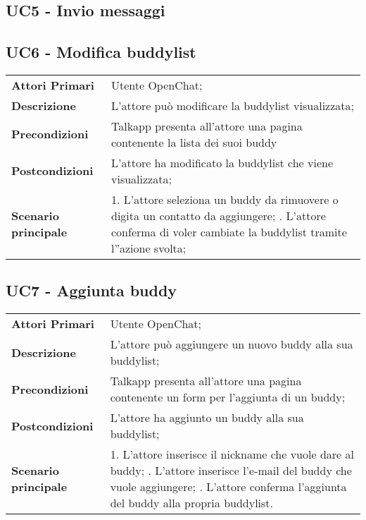 
\subsection{UC5 - Invio messaggi}

\subsection{UC6 - Modifica buddylist}
	\begin{center}
	\bgroup
	\def\arraystretch{1.8}     
	\begin{longtable}{  p{4cm} | p{9.5cm} } 
		\textbf{Attori Primari} & Utente OpenChat; \\ 
		\textbf{Descrizione} &  L'attore può modificare la buddylist visualizzata; \\ 
		\textbf{Precondizioni}  & Talkapp presenta all'attore una pagina contenente la lista dei suoi buddy \\
		\textbf{Postcondizioni} & L'attore ha modificato la buddylist che viene visualizzata; \\ 
		\textbf{Scenario principale} & 
		1. L'attore seleziona un buddy da rimuovere o digita un contatto da aggiungere; \newline
		2. L'attore conferma di voler cambiate la buddylist tramite l''azione svolta;
	\end{longtable}
	\egroup
\end{center}

\subsection{UC7 - Aggiunta buddy}
	\begin{center}
	\bgroup
	\def\arraystretch{1.8}     
	\begin{longtable}{  p{4cm} | p{9.5cm} } 
		\textbf{Attori Primari} & Utente OpenChat; \\ 
		\textbf{Descrizione} &  L'attore può aggiungere un nuovo buddy alla sua buddylist; \\ 
		\textbf{Precondizioni}  & Talkapp presenta all'attore una pagina contenente un form per l'aggiunta di un buddy; \\
		\textbf{Postcondizioni} & L'attore ha aggiunto un buddy alla sua buddylist;  \\ 
		\textbf{Scenario principale} & 
		1. L'attore inserisce il nickname che vuole dare al buddy; \newline
		2. L'attore inserisce l'e-mail del buddy che vuole aggiungere; \newline
		3. L'attore conferma l'aggiunta del buddy alla propria buddylist.
	\end{longtable}
	\egroup
\end{center}

